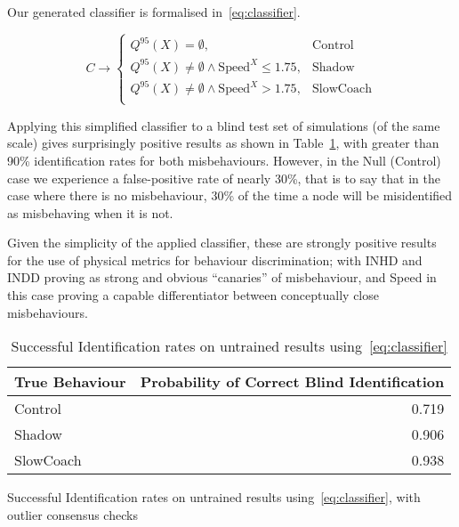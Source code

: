Our generated classifier is formalised in~\eqref{eq:classifier}.

\begin{equation}
  C \rightarrow 
  \begin{cases}
    Q^{95}(X) = \emptyset,& \text{Control}\\
    Q^{95}(X) \neq \emptyset \land \text{Speed}^X \leq 1.75, & \text{Shadow}\\
    Q^{95}(X) \neq \emptyset \land \text{Speed}^X > 1.75,& \text{SlowCoach}\\
  \end{cases}
  \label{eq:classifier}
\end{equation}

Applying this simplified classifier to a blind test set of simulations (of the same scale) gives surprisingly positive results as shown in Table~\ref{tab:classifier}, with greater than 90\% identification rates for both misbehaviours.
However, in the Null (Control) case we experience a false-positive rate of nearly 30\%, that is to say that in the case where there is no misbehaviour, 30\% of the time a node will be misidentified as misbehaving when it is not.

Given the simplicity of the applied classifier, these are strongly positive results for the use of physical metrics for behaviour discrimination; with INHD and INDD proving as strong and obvious ``canaries'' of misbehaviour, and Speed in this case proving a capable differentiator between conceptually close misbehaviours.

\begin{table}[h]
  \caption{Successful Identification rates on untrained results using~\eqref{eq:classifier}}
  \centering
  \begin{tabular}{lr}
    \toprule
    True Behaviour &  Probability of Correct Blind Identification \\
    \midrule
    Control        &                                        0.719 \\
    Shadow         &                                        0.906 \\
    SlowCoach      &                                        0.938 \\
    \bottomrule
  \end{tabular}
  \label{tab:classifier}
\end{table}

\begin{table}[h]
  \caption{Successful Identification rates on untrained results using~\eqref{eq:classifier}, with outlier consensus checks}
  \centering
  
  \label{tab:classifier_minority}
\end{table}




